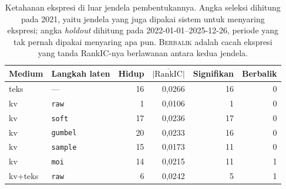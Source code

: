 \begin{table}[htbp]
\centering
\caption{Ketahanan ekspresi di luar jendela pembentukannya. Angka seleksi dihitung pada 2021, yaitu jendela yang juga dipakai sistem untuk menyaring ekspresi; angka \textit{holdout} dihitung pada 2022-01-01--2025-12-26, periode yang tak pernah dipakai menyaring apa pun. \textsc{Berbalik} adalah cacah ekspresi yang tanda RankIC-nya berlawanan antara kedua jendela.}
\label{tab:faktor-holdout}
\small
\begin{tabular}{llrrrr}
\hline
Medium & Langkah laten & Hidup & $\overline{|\mathrm{RankIC}|}$ & Signifikan & Berbalik \\
\hline
teks & --- & 16 & 0,0266 & 16 & 0 \\
\hline
kv & \texttt{raw} & 1 & 0,0106 & 1 & 0 \\
kv & \texttt{soft} & 17 & 0,0236 & 17 & 0 \\
kv & \texttt{gumbel} & 20 & 0,0233 & 16 & 0 \\
kv & \texttt{sample} & 15 & 0,0173 & 11 & 0 \\
kv & \texttt{moi} & 14 & 0,0215 & 11 & 1 \\
\hline
kv+teks & \texttt{raw} & 6 & 0,0242 & 5 & 1 \\
\hline
\end{tabular}
\end{table}
